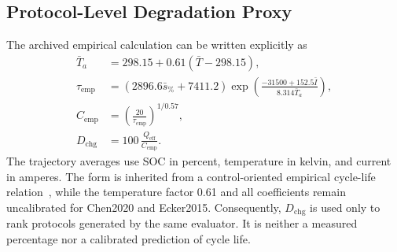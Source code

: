 \subsection{Protocol-Level Degradation Proxy}

The archived empirical calculation can be written explicitly as
\begin{align}
\bar T_a&=298.15+0.61(\bar T-298.15),\nonumber\\
\tau_{\mathrm{emp}}
&=(2896.6\bar s_{\%}+7411.2)
\exp\!\left(\frac{-31500+152.5\bar I}{8.314\bar T_a}\right),\nonumber\\
C_{\mathrm{emp}}&=\left(\frac{20}{\tau_{\mathrm{emp}}}\right)^{1/0.57},
\label{eq:capacity_proxy}\\
D_{\mathrm{chg}}
&=100\,\frac{Q_{\mathrm{eff}}}{C_{\mathrm{emp}}}.
\label{eq:aging}
\end{align}
The trajectory averages use SOC in percent, temperature in kelvin, and current
in amperes. The form is inherited from a control-oriented empirical
cycle-life relation~\cite{ref24}, while the temperature factor 0.61 and all
coefficients remain uncalibrated for Chen2020 and Ecker2015. Consequently,
$D_{\mathrm{chg}}$ is used only to rank protocols generated by the same
evaluator. It is neither a measured percentage nor a calibrated prediction of
cycle life.
